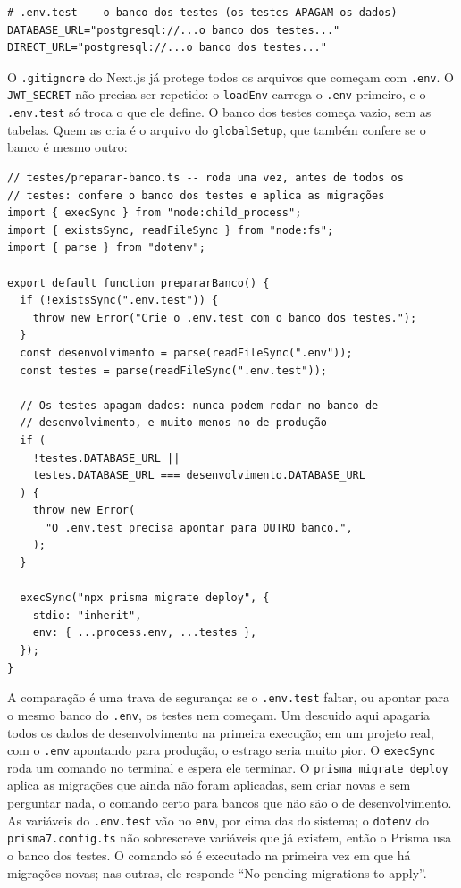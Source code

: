\begin{codigo}
\begin{Verbatim}[breaklines=true, breaksymbolleft={}, fontsize=\footnotesize]
# .env.test -- o banco dos testes (os testes APAGAM os dados)
DATABASE_URL="postgresql://...o banco dos testes..."
DIRECT_URL="postgresql://...o banco dos testes..."
\end{Verbatim}
\end{codigo}

O \texttt{.gitignore} do Next.js já protege todos os arquivos que começam com \texttt{.env}. O \texttt{JWT\_SECRET} não precisa ser repetido: o \texttt{loadEnv} carrega o \texttt{.env} primeiro, e o \texttt{.env.test} só troca o que ele define. O banco dos testes começa vazio, sem as tabelas. Quem as cria é o arquivo do \texttt{globalSetup}, que também confere se o banco é mesmo outro:

\begin{codigo}
\begin{Verbatim}[breaklines=true, breaksymbolleft={}, fontsize=\footnotesize]
// testes/preparar-banco.ts -- roda uma vez, antes de todos os
// testes: confere o banco dos testes e aplica as migrações
import { execSync } from "node:child_process";
import { existsSync, readFileSync } from "node:fs";
import { parse } from "dotenv";

export default function prepararBanco() {
  if (!existsSync(".env.test")) {
    throw new Error("Crie o .env.test com o banco dos testes.");
  }
  const desenvolvimento = parse(readFileSync(".env"));
  const testes = parse(readFileSync(".env.test"));

  // Os testes apagam dados: nunca podem rodar no banco de
  // desenvolvimento, e muito menos no de produção
  if (
    !testes.DATABASE_URL ||
    testes.DATABASE_URL === desenvolvimento.DATABASE_URL
  ) {
    throw new Error(
      "O .env.test precisa apontar para OUTRO banco.",
    );
  }

  execSync("npx prisma migrate deploy", {
    stdio: "inherit",
    env: { ...process.env, ...testes },
  });
}
\end{Verbatim}
\end{codigo}

A comparação é uma trava de segurança: se o \texttt{.env.test} faltar, ou apontar para o mesmo banco do \texttt{.env}, os testes nem começam. Um descuido aqui apagaria todos os dados de desenvolvimento na primeira execução; em um projeto real, com o \texttt{.env} apontando para produção, o estrago seria muito pior. O \texttt{execSync} roda um comando no terminal e espera ele terminar. O \texttt{prisma migrate deploy} aplica as migrações que ainda não foram aplicadas, sem criar novas e sem perguntar nada, o comando certo para bancos que não são o de desenvolvimento. As variáveis do \texttt{.env.test} vão no \texttt{env}, por cima das do sistema; o \texttt{dotenv} do \texttt{prisma7.config.ts} não sobrescreve variáveis que já existem, então o Prisma usa o banco dos testes. O comando só é executado na primeira vez em que há migrações novas; nas outras, ele responde ``No pending migrations to apply''.

